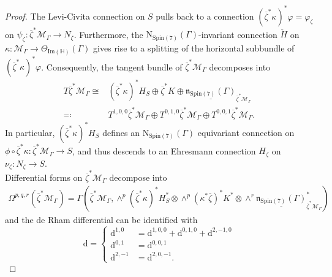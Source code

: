 \documentclass[psamsfonts]{amsart}
\theoremstyle{plain}
\theoremstyle{definition}{
\newtheorem{defi}{Definition}[section]
\newtheorem{ass}{Assumption}
\newtheorem*{nota}{Notation}}
\theoremstyle{remark}{
\newtheorem{rem}{Remark}
\newtheorem{ex}{Example}}
\theoremstyle{plain}{
\newtheorem{thm}{Theorem}[section]
\newtheorem{lem}{Lemma}[section]
\newtheorem{cor}{Corollary}[section]
\newtheorem{prop}{Proposition}[section]
\newtheorem{con}{Conjecture}[section]}
\newcommand{\m}[1]{{\mathrm{#1}}}
\begin{document}
\begin{proof}
The Levi-Civita connection on $S$ pulls back to a connection $(\overline{\zeta}^*\kappa)^*\varphi=\varphi_\zeta$ on $\psi_\zeta \colon\overline{\zeta}^*\mathcal{M}_\Gamma\rightarrow N_\zeta$. Furthermore, 
the $\m{N}_{\m{Spin}(7)}(\Gamma)$-invariant connection ${\check{H}}$ on $\kappa \colon\mathcal{M}_\Gamma\rightarrow \Theta_{\m{Im}(\mathbb{H})}(\Gamma)$ gives rise to a splitting of the horizontal subbundle of $(\overline{\zeta}^*\kappa)^*\varphi$. Consequently, the tangent bundle of $\overline{\zeta}^*\mathcal{M}_\Gamma$ decomposes into 
\begin{align*}
    T\overline{\zeta}^*\mathcal{M}_\Gamma\cong&(\overline{\zeta}^*\kappa)^*H_S\oplus\overline{\zeta}^*K\oplus\underline{\mathfrak{n}_{\m{Spin}(7)}(\Gamma)}_{\overline{\zeta}^*\mathcal{M}_\Gamma}\\
    \eqqcolon&T^{1,0,0}\overline{\zeta}^*\mathcal{M}_\Gamma\oplus T^{0,1,0}\overline{\zeta}^*\mathcal{M}_\Gamma\oplus T^{0,0,1}\overline{\zeta}^*\mathcal{M}_\Gamma.
\end{align*}
In particular, $(\overline{\zeta}^*\kappa)^*H_S$ defines an $\m{N}_{\m{Spin}(7)}(\Gamma)$ equivariant connection on $\phi\circ\overline{\zeta}^*\kappa \colon\overline{\zeta}^*\mathcal{M}_\Gamma\rightarrow S$, and thus descends to an Ehresmann connection $H_\zeta$ on $\nu_\zeta\colon N_\zeta\rightarrow S$.\\

Differential forms on $\overline{\zeta}^*\mathcal{M}_\Gamma$ decompose into
\begin{align*}
    \Omega^{p,q,r}(\overline{\zeta}^*\mathcal{M}_\Gamma)=\Gamma(\overline{\zeta}^*\mathcal{M}_\Gamma,\wedge^p(\overline{\zeta}^*\kappa)^* H_S^* \otimes \wedge^p(\kappa^*\overline{\zeta})^*K^* \otimes\wedge^r\underline{\mathfrak{n}_{\m{Spin}(7)}(\Gamma)}_{\overline{\zeta}^*\mathcal{M}_\Gamma}^*)
\end{align*}
and the de Rham differential can be identified with 
\begin{equation*}
    \m{d}
    =\begin{cases}
        \m{d}^{1,0}&=\m{d}^{1,0,0}+\m{d}^{0,1,0}+\m{d}^{2,-1,0}\\
        \m{d}^{0,1}&=\m{d}^{0,0,1}\\
        \m{d}^{2,-1}&=\m{d}^{2,0,-1}.
    \end{cases}
\end{equation*}



\end{proof}
\end{document}
